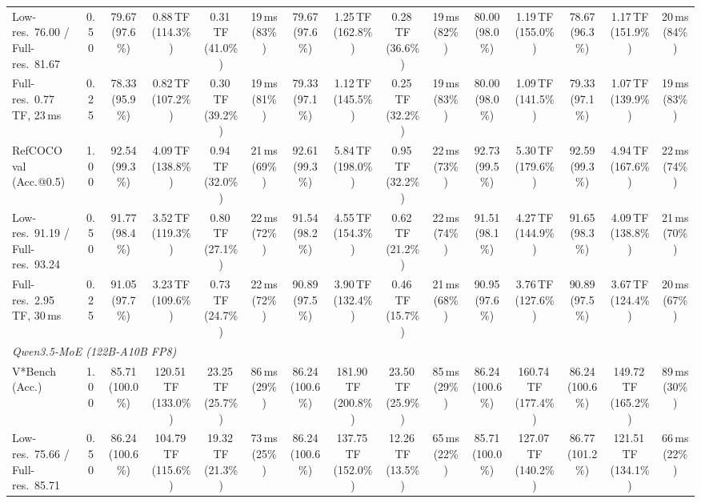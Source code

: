 \begin{table}[t]
{\begin{tabular}{l c | c c c c | c c c c | c c | c c c}
{\footnotesize Low-res.\ 76.00 / Full-res.\ 81.67} & 0.50 & 79.67 (97.6\%) & 0.88\,TF (114.3\%) & 0.31\,TF (41.0\%) & 19\,ms (83\%) & 79.67 (97.6\%) & 1.25\,TF (162.8\%) & 0.28\,TF (36.6\%) & 19\,ms (82\%) & 80.00 (98.0\%) & 1.19\,TF (155.0\%) & 78.67 (96.3\%) & 1.17\,TF (151.9\%) & 20\,ms (84\%) \\
{\footnotesize Full-res.\ 0.77\,TF, 23\,ms} & 0.25 & 78.33 (95.9\%) & 0.82\,TF (107.2\%) & 0.30\,TF (39.2\%) & 19\,ms (81\%) & 79.33 (97.1\%) & 1.12\,TF (145.5\%) & 0.25\,TF (32.2\%) & 19\,ms (83\%) & 80.00 (98.0\%) & 1.09\,TF (141.5\%) & 79.33 (97.1\%) & 1.07\,TF (139.9\%) & 19\,ms (83\%) \\
\cmidrule(lr){1-15}
RefCOCO val (Acc.@0.5) & 1.00 & \cellcolor{gray!15}92.54 (99.3\%) & 4.09\,TF (138.8\%) & 0.94\,TF (32.0\%) & 21\,ms (69\%) & \cellcolor{gray!15}92.61 (99.3\%) & 5.84\,TF (198.0\%) & 0.95\,TF (32.2\%) & 22\,ms (73\%) & \cellcolor{gray!15}92.73 (99.5\%) & 5.30\,TF (179.6\%) & \cellcolor{gray!15}92.59 (99.3\%) & 4.94\,TF (167.6\%) & 22\,ms (74\%) \\
{\footnotesize Low-res.\ 91.19 / Full-res.\ 93.24} & 0.50 & \cellcolor{gray!15}91.77 (98.4\%) & 3.52\,TF (119.3\%) & 0.80\,TF (27.1\%) & 22\,ms (72\%) & \cellcolor{gray!15}91.54 (98.2\%) & 4.55\,TF (154.3\%) & 0.62\,TF (21.2\%) & 22\,ms (74\%) & \cellcolor{gray!15}91.51 (98.1\%) & 4.27\,TF (144.9\%) & \cellcolor{gray!15}91.65 (98.3\%) & 4.09\,TF (138.8\%) & 21\,ms (70\%) \\
{\footnotesize Full-res.\ 2.95\,TF, 30\,ms} & 0.25 & 91.05 (97.7\%) & 3.23\,TF (109.6\%) & 0.73\,TF (24.7\%) & 22\,ms (72\%) & 90.89 (97.5\%) & 3.90\,TF (132.4\%) & 0.46\,TF (15.7\%) & 21\,ms (68\%) & 90.95 (97.6\%) & 3.76\,TF (127.6\%) & 90.89 (97.5\%) & 3.67\,TF (124.4\%) & 20\,ms (67\%) \\
\midrule
\multicolumn{15}{l}{\emph{Qwen3.5-MoE (122B-A10B FP8)}} \\
V*Bench (Acc.) & 1.00 & \cellcolor{gray!15}85.71 (100.0\%) & 120.51\,TF (133.0\%) & 23.25\,TF (25.7\%) & 86\,ms (29\%) & \cellcolor{gray!15}86.24 (100.6\%) & 181.90\,TF (200.8\%) & 23.50\,TF (25.9\%) & 85\,ms (29\%) & \cellcolor{gray!15}86.24 (100.6\%) & 160.74\,TF (177.4\%) & \cellcolor{gray!15}86.24 (100.6\%) & 149.72\,TF (165.2\%) & 89\,ms (30\%) \\
{\footnotesize Low-res.\ 75.66 / Full-res.\ 85.71} & 0.50 & \cellcolor{gray!15}86.24 (100.6\%) & 104.79\,TF (115.6\%) & 19.32\,TF (21.3\%) & 73\,ms (25\%) & \cellcolor{gray!15}86.24 (100.6\%) & 137.75\,TF (152.0\%) & 12.26\,TF (13.5\%) & 65\,ms (22\%) & \cellcolor{gray!15}85.71 (100.0\%) & 127.07\,TF (140.2\%) & \cellcolor{gray!15}86.77 (101.2\%) & 121.51\,TF (134.1\%) & 66\,ms (22\%) \\

\end{tabular}}
\end{table}
